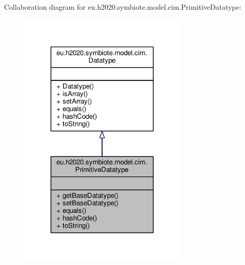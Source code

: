 Collaboration diagram for eu.\+h2020.\+symbiote.\+model.\+cim.\+Primitive\+Datatype\+:
\nopagebreak
\begin{figure}[H]
\begin{center}
\leavevmode
\includegraphics[width=228pt]{classeu_1_1h2020_1_1symbiote_1_1model_1_1cim_1_1PrimitiveDatatype__coll__graph}
\end{center}
\end{figure}
